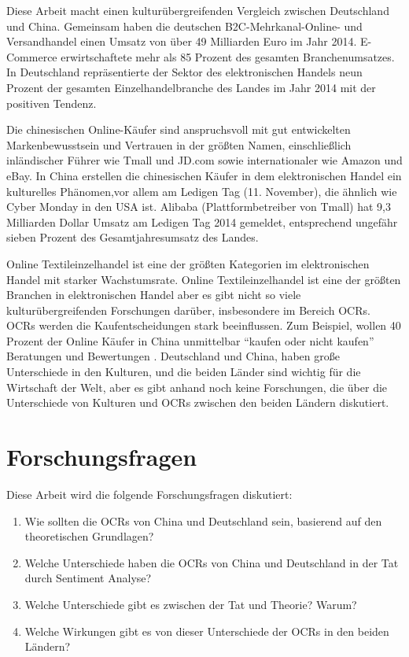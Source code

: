 Diese Arbeit macht einen kulturübergreifenden Vergleich zwischen Deutschland und China. Gemeinsam haben die deutschen \acs{B2C}-Mehrkanal-Online- und Versandhandel einen Umsatz von über 49 Milliarden Euro im Jahr 2014. E-Commerce erwirtschaftete mehr als 85 Prozent des gesamten Branchenumsatzes. In Deutschland repräsentierte der Sektor des elektronischen Handels neun Prozent der gesamten Einzelhandelbranche des Landes im Jahr 2014 mit der positiven Tendenz. \citep{Spath2015}

Die chinesischen Online-Käufer sind anspruchsvoll mit gut entwickelten Markenbewusstsein und Vertrauen in der größten Namen, einschließlich inländischer Führer wie Tmall und JD.com sowie internationaler wie Amazon und eBay. In China erstellen die chinesischen Käufer in dem elektronischen Handel ein kulturelles Phänomen,vor allem am Ledigen Tag (11. November), die ähnlich wie Cyber Monday in den USA ist. Alibaba (Plattformbetreiber von Tmall) hat 9,3 Milliarden Dollar Umsatz am Ledigen Tag 2014 gemeldet, entsprechend ungefähr sieben Prozent des Gesamtjahresumsatz des Landes. \citep{HanaBen-Shabat2015}

Online Textileinzelhandel ist eine der größten Kategorien im elektronischen Handel mit starker Wachstumsrate. Online Textileinzelhandel ist eine der größten Branchen in elektronischen Handel aber es gibt nicht so viele kulturübergreifenden Forschungen darüber, insbesondere im Bereich \acl{OCRs}. \ac{OCRs} werden die Kaufentscheidungen stark beeinflussen. Zum Beispiel, wollen 40 Prozent der Online Käufer in China unmittelbar ``kaufen oder nicht kaufen'' Beratungen und Bewertungen \citep{HanaBen-Shabat2015}. Deutschland und China, haben große Unterschiede in den Kulturen, und die beiden Länder sind wichtig für die Wirtschaft der Welt, aber es gibt anhand noch keine Forschungen, die über die Unterschiede von Kulturen und \ac{OCRs} zwischen den beiden Ländern diskutiert.
\section{Forschungsfragen}
Diese Arbeit wird die folgende Forschungsfragen diskutiert:
\begin{enumerate}
	\item Wie sollten die \acl{OCRs} von China und Deutschland sein, basierend auf den theoretischen Grundlagen? 
	\item Welche Unterschiede haben die \acl{OCRs} von China und Deutschland in der Tat durch Sentiment Analyse? 
	\item Welche Unterschiede gibt es zwischen der Tat und Theorie? Warum?
	\item Welche Wirkungen gibt es von dieser Unterschiede der \acl{OCRs} in den beiden Ländern?
\end{enumerate}

